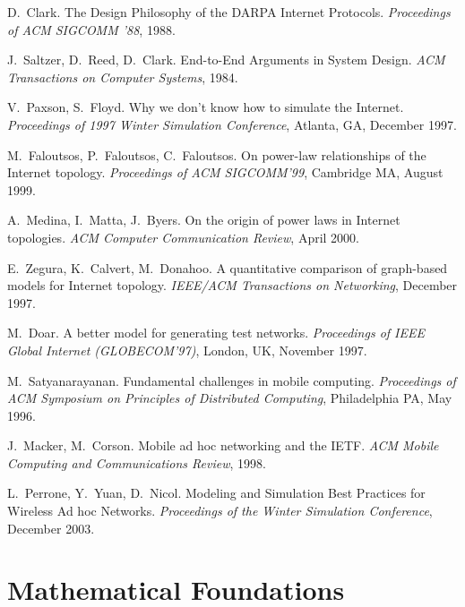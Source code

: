 \documentclass{article}
\newcounter{myEnumCounter}
\newcounter{mySaveCounter}
\renewenvironment{enumerate}{%
  \begin{list}{[\arabic{myEnumCounter}]}{\usecounter{myEnumCounter}%
  \setcounter{myEnumCounter}{\value{mySaveCounter}}}
  }{%
  \setcounter{mySaveCounter}{\value{myEnumCounter}}\end{list}%
}
\begin{document}
\begin{enumerate}

D.~Clark. The Design Philosophy of the DARPA Internet Protocols. \textit{Proceedings of ACM SIGCOMM '88}, 1988.

 J.~Saltzer, D.~Reed,  D.~Clark. End-to-End Arguments in System Design. \textit{ACM Transactions on Computer Systems}, 1984.


V.~Paxson, S.~Floyd.
Why we don't know how to simulate the Internet.
\textit{Proceedings of 1997 Winter Simulation Conference}, Atlanta, GA, December 1997.

M.~Faloutsos, P.~Faloutsos, C.~Faloutsos.
On power-law relationships of the Internet topology.
\textit{Proceedings of ACM SIGCOMM'99}, Cambridge MA,
  August 1999.

A.~Medina, I.~Matta, J.~Byers.
On the origin of power laws in Internet topologies.
\textit{ACM Computer Communication Review}, April 2000.

E.~Zegura, K.~Calvert, M.~Donahoo.
A quantitative comparison of graph-based models for Internet topology.
\textit{IEEE/ACM Transactions on Networking}, December 1997.

M.~Doar.
A better model for generating test networks.
\textit{Proceedings of IEEE Global Internet (GLOBECOM'97)}, London, UK, November 1997.
  
M.~Satyanarayanan.
Fundamental challenges in mobile computing.
\textit{Proceedings of ACM Symposium on Principles of Distributed Computing}, Philadelphia PA, May 1996.

J.~Macker, M.~Corson.
Mobile ad hoc networking and the IETF.
\textit{ACM Mobile Computing and Communications Review}, 1998.

L.~Perrone, Y.~Yuan, D.~Nicol.
Modeling and Simulation Best Practices for Wireless Ad hoc Networks.
\textit{Proceedings of the Winter Simulation Conference}, December 2003.

\end{enumerate}

\section{Mathematical Foundations}
\end{document}
